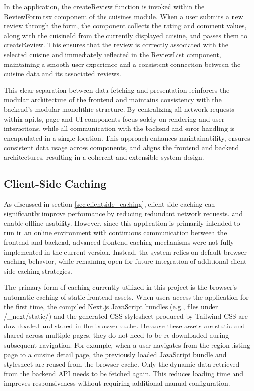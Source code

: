 In the application, the createReview function is invoked within the ReviewForm.tsx component 
of the cuisines module. When a user submits a new review through the form, the component collects 
the rating and comment values, along with the cuisineId from the currently displayed cuisine, 
and passes them to createReview. This ensures that the review is correctly associated with the selected 
cuisine and immediately reflected in the ReviewList component, maintaining a smooth user experience 
and a consistent connection between the cuisine data and its associated reviews.

This clear separation between data fetching and presentation reinforces the modular architecture 
of the frontend and maintains consistency with the backend's modular monolithic structure. 
By centralizing all network requests within api.ts, page and UI components focus solely on rendering 
and user interactions, while all communication with the backend and error handling is encapsulated 
in a single location. This approach enhances maintainability, ensures consistent data usage across 
components, and aligns the frontend and backend architectures, resulting in a coherent and extensible 
system design.

\subsection{Client-Side Caching}

As discussed in section \ref{sec:clientside_caching}, client-side caching can significantly improve performance 
by reducing redundant network requests, and enable offline usability. 
However, since this application is primarily intended to run in an online environment 
with continuous communication between the frontend and backend, 
advanced frontend caching mechanisms were not fully implemented in the current version. 
Instead, the system relies on default browser caching behavior, 
while remaining open for future integration of additional client-side caching strategies.

The primary form of caching currently utilized in this project 
is the browser’s automatic caching of static frontend assets. 
When users access the application for the first time, 
the compiled Next.js JavaScript bundles (e.g., files under {/\_next/static/}) 
and the generated CSS stylesheet produced by Tailwind CSS 
are downloaded and stored in the browser cache.
Because these assets are static and shared across multiple pages, 
they do not need to be re-downloaded during subsequent navigation. 
For example, when a user navigates from the region listing page to a cuisine detail page, 
the previously loaded JavaScript bundle and stylesheet are reused from the browser cache. 
Only the dynamic data retrieved from the backend API needs to be fetched again. 
This reduces loading time and improves responsiveness without requiring additional manual configuration.


